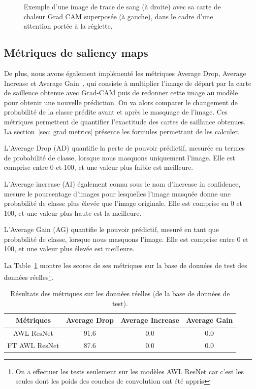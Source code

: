 \begin{figure}[ht]
\begin{subfigure}{0.40\linewidth}
    \end{subfigure}
    \caption{Exemple d'une image de trace de sang (à droite) avec sa carte de chaleur Grad CAM superposée (à gauche), dans le cadre d'une attention portée à la réglette.}
    \label{fig:grad_cam reglette}
\end{figure}

\subsection{Métriques de saliency maps}
De plus, nous avons également implémenté les métriques Average Drop, Average Increase et Average Gain~\cite{opticam}, qui consiste à multiplier l'image de départ par la carte de saillence obtenue avec Grad-CAM puis de redonner cette image au modèle pour obtenir une nouvelle prédiction. On va alors comparer le changement de probabilité de la classe prédite avant et après le masquage de l'image. Ces métriques permettent de quantifier l'exactitude des cartes de saillance obtenues. La section~\ref{sec: grad metrics} présente les formules permettant de les calculer.

L'Average Drop (AD) quantifie la perte de pouvoir prédictif, mesurée en termes de probabilité de classe, lorsque nous masquons uniquement l'image. Elle est comprise entre 0 et 100, et une valeur plus faible est meilleure.

L'Average increase (AI) également connu sous le nom d'increase in confidence, mesure le pourcentage d'images pour lesquelles l'image masquée donne une probabilité de classe plus élevée que l'image originale. Elle est comprise en 0 et 100, et une valeur plus haute est la meilleure.

L'Average Gain (AG) quantifie le pouvoir prédictif, mesuré en tant que probabilité de classe, lorsque nous masquons l'image. Elle est comprise entre 0 et 100, et une valeur plus élevée est meilleure.

La Table~\ref{tab:saliency_results} montre les scores de ses métriques sur la base de données de test des données réelles\footnote{On a effectuer les tests seulement sur les modèles AWL ResNet car c'est les seules dont les poids des couches de convolution ont été appris}.

\begin{table}[ht]
    \centering
    \begin{tabular}{cccc}
        \toprule
        Métriques & Average Drop & Average Increase & Average Gain \\
        \midrule
        AWL ResNet & 91.6 & 0.0& 0.0\\
        FT AWL ResNet & 87.6 & 0.0 & 0.0\\
        \bottomrule
        \end{tabular}
    \caption{Résultats des métriques sur les données réelles (de la base de données de test).}
    \label{tab:saliency_results}
\end{table}

